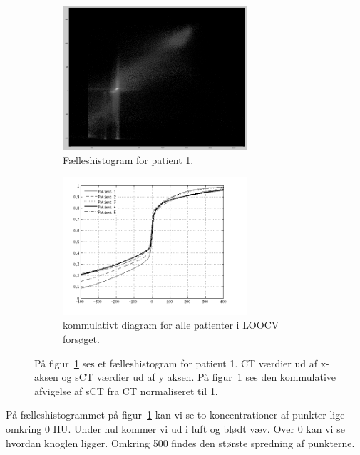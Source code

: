 \begin{figure}
    \centering
    \begin{subfigure}[b]{0.45\textwidth}
        \includegraphics[width=0.75\textwidth]{loocv_joint_histogram.png}
        \caption{Fælleshistogram for patient 1.}
        \label{fig:loocv_j_h}
    \end{subfigure}\hfill
    \begin{subfigure}[b]{0.45\textwidth}
        \includegraphics[width=0.75\textwidth]{cumm_diff_loocv.png}
        \caption{kommulativt diagram for alle patienter i LOOCV forsøget.}
        \label{fig:cumm_diff_loocv}
    \end{subfigure}
    \caption{På figur~\ref{fig:loocv_j_h} ses et fælleshistogram for patient 1. CT værdier ud af x-aksen og sCT værdier ud af y aksen. På figur~\ref{fig:loocv_j_h} ses den kommulative afvigelse af sCT fra CT normaliseret til 1.}
    \label{fig:loocv}
\end{figure}

På fælleshistogrammet på figur~\ref{fig:loocv_j_h} kan vi se to koncentrationer af punkter lige omkring 0 HU. Under nul kommer vi ud i luft og blødt væv. Over 0 kan vi se hvordan knoglen ligger. Omkring 500 findes den største spredning af punkterne.

